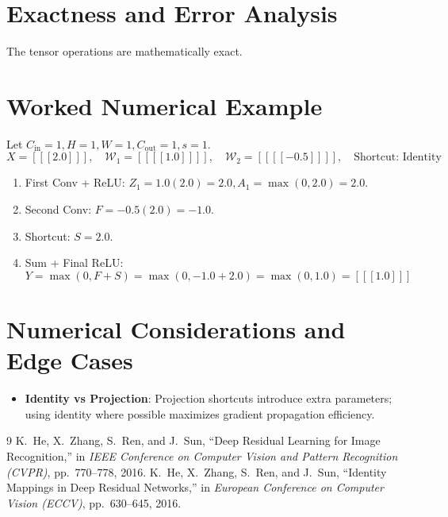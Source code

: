 \documentclass[11pt,a4paper]{article}
\theoremstyle{definition}
\begin{document}
\section{Exactness and Error Analysis}

The tensor operations are mathematically exact.

\section{Worked Numerical Example}

Let $C_{\text{in}} = 1, H = 1, W = 1, C_{\text{out}} = 1, s = 1$.
\begin{equation}
X = [[[2.0]]], \quad \mathcal{W}_1 = [[[[1.0]]]], \quad \mathcal{W}_2 = [[[[-0.5]]]], \quad \text{Shortcut: Identity}
\end{equation}

\begin{enumerate}
    \item First Conv + ReLU: $Z_1 = 1.0(2.0) = 2.0, A_1 = \max(0, 2.0) = 2.0$.
    \item Second Conv: $F = -0.5(2.0) = -1.0$.
    \item Shortcut: $S = 2.0$.
    \item Sum + Final ReLU:
    \begin{equation}
    Y = \max(0, F + S) = \max(0, -1.0 + 2.0) = \max(0, 1.0) = [[[1.0]]]
    \end{equation}
\end{enumerate}

\section{Numerical Considerations and Edge Cases}

\begin{itemize}
    \item \textbf{Identity vs Projection}: Projection shortcuts introduce extra parameters; using identity where possible maximizes gradient propagation efficiency.
\end{itemize}

\begin{thebibliography}{9}
 K.~He, X.~Zhang, S.~Ren, and J.~Sun, ``Deep Residual Learning for Image Recognition,'' in \emph{IEEE Conference on Computer Vision and Pattern Recognition (CVPR)}, pp.~770--778, 2016.
 K.~He, X.~Zhang, S.~Ren, and J.~Sun, ``Identity Mappings in Deep Residual Networks,'' in \emph{European Conference on Computer Vision (ECCV)}, pp.~630--645, 2016.
\end{thebibliography}
\end{document}
